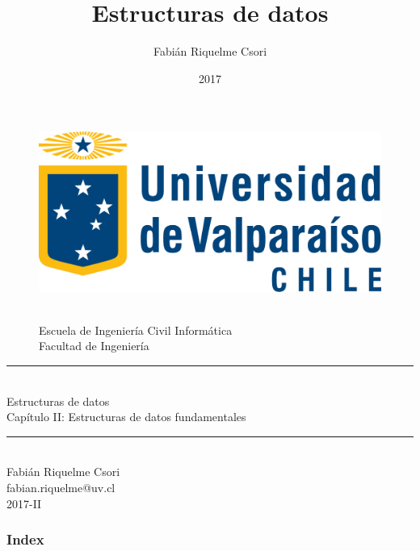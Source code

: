 \documentclass{beamer} %
\title{Estructuras de datos}   %
\author{Fabián Riquelme Csori} %
\date{2017}                    %
\institute{Universidad de Valparaíso}                 %
\newcommand{\HRule}{\rule{\linewidth}{0.2mm}\\[1ex]}
\begin{document}
%

\begin{frame}[plain]
  \begin{figure}[h]
    \begin{minipage}{0.3\textwidth}
    \includegraphics[width=.9\textwidth]{./image/logo-UV.png}
    \end{minipage}
    \begin{minipage}{0.65\textwidth}
     $~$\\[3.6ex]
     \footnotesize{Escuela de Ingeniería Civil Informática}\\
     \footnotesize{Facultad de Ingeniería}
    \end{minipage}
  \end{figure}
  \begin{center}
    \vspace{1ex}
    \HRule
    \Large{Estructuras de datos}\\{\small Capítulo II: Estructuras de datos fundamentales}\\[-1ex]
    \HRule\vspace{1ex}
    \large{Fabián Riquelme Csori}\\[.5ex]\footnotesize{fabian.riquelme@uv.cl}\\[6ex] {\tiny 2017-II}\\[6ex]
  \end{center}
\end{frame}

\begin{frame}
 \frametitle{Index}
 \scriptsize 			%
 \tableofcontents		%
\end{frame}
\end{document}
